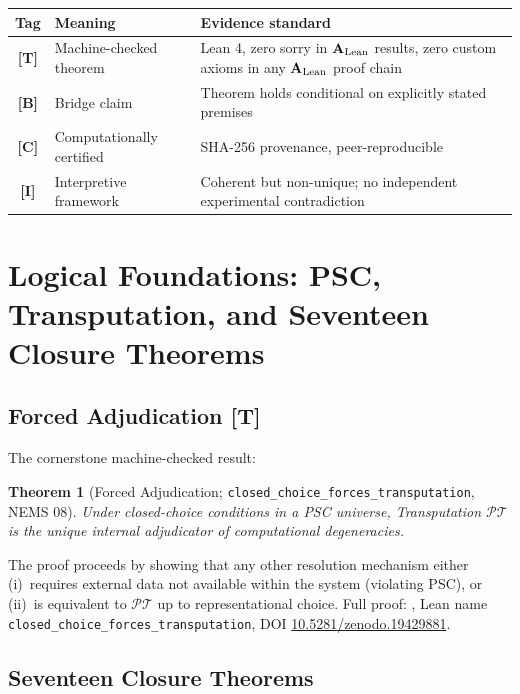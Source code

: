 \documentclass[11pt]{article}
\newcommand{\PT}{\mathcal{P}\mathcal{T}}
\newcommand{\tagT}{\textbf{[T]}}
\newcommand{\tagB}{\textbf{[B]}}
\newcommand{\tagC}{\textbf{[C]}}
\newcommand{\tagI}{\textbf{[I]}}
\newcommand{\CatAL}{\ensuremath{\textbf{A}_{\rm Lean}}}
\theoremstyle{plain}
\newtheorem{theorem}{Theorem}[section]
\theoremstyle{definition}
\theoremstyle{remark}
\begin{document}
\begin{center}
\small
\begin{tabular}{@{}clp{6.5cm}@{}}
\toprule
Tag & Meaning & Evidence standard \\
\midrule
\tagT{} & Machine-checked theorem & Lean 4, zero sorry in \CatAL{} results, zero custom axioms in any \CatAL{} proof chain \\
\tagB{} & Bridge claim & Theorem holds conditional on explicitly stated premises \\
\tagC{} & Computationally certified & SHA-256 provenance, peer-reproducible \\
\tagI{} & Interpretive framework & Coherent but non-unique; no independent experimental contradiction \\
\bottomrule
\end{tabular}
\end{center}

\section{Logical Foundations: PSC, Transputation, and Seventeen Closure Theorems}
\label{sec:foundations}

\subsection{Forced Adjudication \tagT{}}

The cornerstone machine-checked result:

\begin{theorem}[Forced Adjudication; \texttt{closed\_choice\_forces\_transputation}, NEMS 08]
Under closed-choice conditions in a PSC universe, Transputation $\PT$ is the unique
internal adjudicator of computational degeneracies.
\end{theorem}

\noindent The proof proceeds by showing that any other resolution mechanism either (i)~requires
external data not available within the system (violating PSC), or (ii)~is equivalent to $\PT$
up to representational choice.
Full proof: \cite{SpivackNEMSLean}, Lean name \texttt{closed\_choice\_forces\_transputation},
DOI \href{https://doi.org/10.5281/zenodo.19429881}{10.5281/zenodo.19429881}.

\subsection{Seventeen Closure Theorems}
\end{document}
